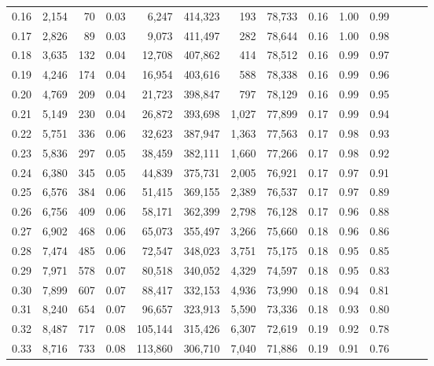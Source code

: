 \begin{tabular}{rrrrrrrrrrrrrr}
0.16 &   2,154 &     70 &  0.03 &    6,247 &  414,323 &     193 &  78,733 &  0.16 &  1.00 &      0.99 \\
0.17 &   2,826 &     89 &  0.03 &    9,073 &  411,497 &     282 &  78,644 &  0.16 &  1.00 &      0.98 \\
0.18 &   3,635 &    132 &  0.04 &   12,708 &  407,862 &     414 &  78,512 &  0.16 &  0.99 &      0.97 \\
0.19 &   4,246 &    174 &  0.04 &   16,954 &  403,616 &     588 &  78,338 &  0.16 &  0.99 &      0.96 \\
0.20 &   4,769 &    209 &  0.04 &   21,723 &  398,847 &     797 &  78,129 &  0.16 &  0.99 &      0.95 \\
0.21 &   5,149 &    230 &  0.04 &   26,872 &  393,698 &   1,027 &  77,899 &  0.17 &  0.99 &      0.94 \\
0.22 &   5,751 &    336 &  0.06 &   32,623 &  387,947 &   1,363 &  77,563 &  0.17 &  0.98 &      0.93 \\
0.23 &   5,836 &    297 &  0.05 &   38,459 &  382,111 &   1,660 &  77,266 &  0.17 &  0.98 &      0.92 \\
0.24 &   6,380 &    345 &  0.05 &   44,839 &  375,731 &   2,005 &  76,921 &  0.17 &  0.97 &      0.91 \\
0.25 &   6,576 &    384 &  0.06 &   51,415 &  369,155 &   2,389 &  76,537 &  0.17 &  0.97 &      0.89 \\
0.26 &   6,756 &    409 &  0.06 &   58,171 &  362,399 &   2,798 &  76,128 &  0.17 &  0.96 &      0.88 \\
0.27 &   6,902 &    468 &  0.06 &   65,073 &  355,497 &   3,266 &  75,660 &  0.18 &  0.96 &      0.86 \\
0.28 &   7,474 &    485 &  0.06 &   72,547 &  348,023 &   3,751 &  75,175 &  0.18 &  0.95 &      0.85 \\
0.29 &   7,971 &    578 &  0.07 &   80,518 &  340,052 &   4,329 &  74,597 &  0.18 &  0.95 &      0.83 \\
0.30 &   7,899 &    607 &  0.07 &   88,417 &  332,153 &   4,936 &  73,990 &  0.18 &  0.94 &      0.81 \\
0.31 &   8,240 &    654 &  0.07 &   96,657 &  323,913 &   5,590 &  73,336 &  0.18 &  0.93 &      0.80 \\
0.32 &   8,487 &    717 &  0.08 &  105,144 &  315,426 &   6,307 &  72,619 &  0.19 &  0.92 &      0.78 \\
0.33 &   8,716 &    733 &  0.08 &  113,860 &  306,710 &   7,040 &  71,886 &  0.19 &  0.91 &      0.76 \\

\end{tabular}
